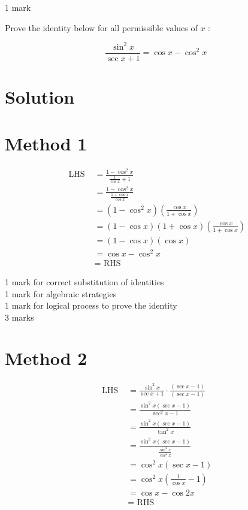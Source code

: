 \documentclass[10pt]{article}
\begin{document}
1 mark

Prove the identity below for all permissible values of $x$ :

$$
\frac{\sin ^{2} x}{\sec x+1}=\cos x-\cos ^{2} x
$$

\section*{Solution}
\section*{Method 1}
$$
\begin{aligned}
\text { LHS } & =\frac{1-\cos ^{2} x}{\frac{1}{\cos x}+1} \\
& =\frac{1-\cos ^{2} x}{\frac{1+\cos x}{\cos x}} \\
& =\left(1-\cos ^{2} x\right)\left(\frac{\cos x}{1+\cos x}\right) \\
& =(1-\cos x)(1+\cos x)\left(\frac{\cos x}{1+\cos x}\right) \\
& =(1-\cos x)(\cos x) \\
& =\cos x-\cos ^{2} x \\
& =\text { RHS }
\end{aligned}
$$

1 mark for correct substitution of identities\\
1 mark for algebraic strategies\\
1 mark for logical process to prove the identity\\
3 marks

\section*{Method 2}
$$
\begin{aligned}
\text { LHS } & =\frac{\sin ^{2} x}{\sec x+1} \cdot \frac{(\sec x-1)}{(\sec x-1)} \\
& =\frac{\sin ^{2} x(\sec x-1)}{\sec ^{2} x-1} \\
& =\frac{\sin ^{2} x(\sec x-1)}{\tan ^{2} x} \\
& =\frac{\sin ^{2} x(\sec x-1)}{\frac{\sin ^{2} x}{\cos ^{2} x}} \\
& =\cos ^{2} x(\sec x-1) \\
& =\cos ^{2} x\left(\frac{1}{\cos x}-1\right) \\
& =\cos x-\cos 2 x \\
& =\text { RHS }
\end{aligned}
$$
\end{document}
